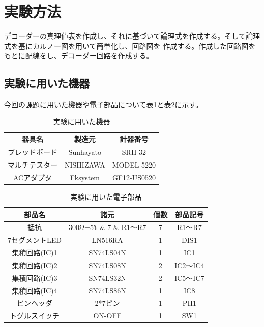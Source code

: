 \documentclass[a4paper,11pt,dvipdfmx]{jsarticle}
\begin{document}
\section{実験方法}
デコーダーの真理値表を作成し、それに基づいて論理式を作成する。そして論理式を基にカルノー図を用いて簡単化し、回路図を
作成する。作成した回路図をもとに配線をし、デコーダー回路を作成する。

\subsection{実験に用いた機器}
今回の課題に用いた機器や電子部品について表\ref{tab:equipment}と表\ref{tab:electronicParts}に示す。

\begin{table}[H]
  \caption{実験に用いた機器}
  \centering
  \begin{tabular}{c|c|c}
    \hline
    器具名         & 製造元    & 計器番号    \\
    \hline \hline
    ブレッドボード & Sunhayato & SRH-32      \\
    \hline
    マルチテスター & NISHIZAWA & MODEL 5220  \\
    \hline
    ACアダプタ     & Fksystem  & GF12-US0520 \\
    \hline
  \end{tabular}
  \label{tab:equipment}
\end{table}


\begin{table}[H]
  \caption{実験に用いた電子部品}
  \centering
  \begin{tabular}{c|c|c|c}
    \hline
    部品名         & 諸元                & 個数 & 部品記号 \\
    \hline \hline
    抵抗           & 300Ω±5\verb|%| & 7    & R1～R7   \\
    \hline
    7セグメントLED & LN516RA             & 1    & DIS1     \\
    \hline
    集積回路(IC)1  & SN74LS04N           & 1    & IC1      \\
    \hline
    集積回路(IC)2  & SN74LS08N           & 2    & IC2～IC4 \\
    \hline
    集積回路(IC)3  & SN74LS32N           & 2    & IC5～IC7 \\
    \hline
    集積回路(IC)4  & SN74LS86N           & 1    & IC8      \\
    \hline
    ピンヘッダ     & 2*7ピン             & 1    & PH1      \\
    \hline
    トグルスイッチ & ON-OFF              & 1    & SW1      \\
    \hline
  \end{tabular}
  \label{tab:electronicParts}
\end{table}
\end{document}
